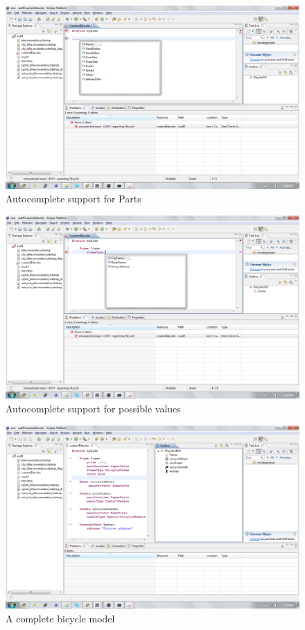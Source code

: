 \begin{figure}[H]
    \begin{center}
        \includegraphics[width=\textwidth]{fig/xtext/xtext_example_autocomplete.pdf}
        \caption{Autocomplete support for Parts}
        \label{fig.dsl_autocomplete_parts}
    \end{center}
\end{figure}

\begin{figure}[H]
    \begin{center}
        \includegraphics[width=\textwidth]{fig/xtext/xtext_example_autocomplete_value.pdf}
        \caption{Autocomplete support for possible values}
        \label{fig.dsl_autocomplete_values}
    \end{center}
\end{figure}

\begin{figure}[H]
    \begin{center}
        \includegraphics[width=\textwidth]{fig/xtext/xtext_example_complete.pdf}
        \caption{A complete bicycle model}
        \label{fig.dsl_complete}
    \end{center}
\end{figure}